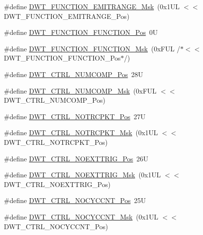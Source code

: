\begin{DoxyCompactItemize}
\item 
\#define \hyperlink{group___c_m_s_i_s___d_w_t_gad46dd5aba29f2e28d4d3f50b1d291f41}{D\-W\-T\-\_\-\-F\-U\-N\-C\-T\-I\-O\-N\-\_\-\-E\-M\-I\-T\-R\-A\-N\-G\-E\-\_\-\-Msk}~(0x1\-U\-L $<$$<$ D\-W\-T\-\_\-\-F\-U\-N\-C\-T\-I\-O\-N\-\_\-\-E\-M\-I\-T\-R\-A\-N\-G\-E\-\_\-\-Pos)
\item 
\#define \hyperlink{group___c_m_s_i_s___d_w_t_ga5797b556edde2bbaa4d33dcdb1a891bb}{D\-W\-T\-\_\-\-F\-U\-N\-C\-T\-I\-O\-N\-\_\-\-F\-U\-N\-C\-T\-I\-O\-N\-\_\-\-Pos}~0\-U
\item 
\#define \hyperlink{group___c_m_s_i_s___d_w_t_ga3b2cda708755ecf5f921d08b25d774d1}{D\-W\-T\-\_\-\-F\-U\-N\-C\-T\-I\-O\-N\-\_\-\-F\-U\-N\-C\-T\-I\-O\-N\-\_\-\-Msk}~(0x\-F\-U\-L /$\ast$$<$$<$ D\-W\-T\-\_\-\-F\-U\-N\-C\-T\-I\-O\-N\-\_\-\-F\-U\-N\-C\-T\-I\-O\-N\-\_\-\-Pos$\ast$/)
\item 
\#define \hyperlink{group___c_m_s_i_s___d_w_t_gaac44b9b7d5391a7ffef129b7f6c84cd7}{D\-W\-T\-\_\-\-C\-T\-R\-L\-\_\-\-N\-U\-M\-C\-O\-M\-P\-\_\-\-Pos}~28\-U
\item 
\#define \hyperlink{group___c_m_s_i_s___d_w_t_gaa3d37d68c2ba73f2026265584c2815e7}{D\-W\-T\-\_\-\-C\-T\-R\-L\-\_\-\-N\-U\-M\-C\-O\-M\-P\-\_\-\-Msk}~(0x\-F\-U\-L $<$$<$ D\-W\-T\-\_\-\-C\-T\-R\-L\-\_\-\-N\-U\-M\-C\-O\-M\-P\-\_\-\-Pos)
\item 
\#define \hyperlink{group___c_m_s_i_s___d_w_t_gaa82840323a2628e7f4a2b09b74fa73fd}{D\-W\-T\-\_\-\-C\-T\-R\-L\-\_\-\-N\-O\-T\-R\-C\-P\-K\-T\-\_\-\-Pos}~27\-U
\item 
\#define \hyperlink{group___c_m_s_i_s___d_w_t_ga04d8bb0a065ca38e2e5f13a97e1f7073}{D\-W\-T\-\_\-\-C\-T\-R\-L\-\_\-\-N\-O\-T\-R\-C\-P\-K\-T\-\_\-\-Msk}~(0x1\-U\-L $<$$<$ D\-W\-T\-\_\-\-C\-T\-R\-L\-\_\-\-N\-O\-T\-R\-C\-P\-K\-T\-\_\-\-Pos)
\item 
\#define \hyperlink{group___c_m_s_i_s___d_w_t_gad997b9026715d5609b5a3b144eca42d0}{D\-W\-T\-\_\-\-C\-T\-R\-L\-\_\-\-N\-O\-E\-X\-T\-T\-R\-I\-G\-\_\-\-Pos}~26\-U
\item 
\#define \hyperlink{group___c_m_s_i_s___d_w_t_gacc7d15edf7a27147c422099ab475953e}{D\-W\-T\-\_\-\-C\-T\-R\-L\-\_\-\-N\-O\-E\-X\-T\-T\-R\-I\-G\-\_\-\-Msk}~(0x1\-U\-L $<$$<$ D\-W\-T\-\_\-\-C\-T\-R\-L\-\_\-\-N\-O\-E\-X\-T\-T\-R\-I\-G\-\_\-\-Pos)
\item 
\#define \hyperlink{group___c_m_s_i_s___d_w_t_ga337f6167d960f57f12aa382ffecce522}{D\-W\-T\-\_\-\-C\-T\-R\-L\-\_\-\-N\-O\-C\-Y\-C\-C\-N\-T\-\_\-\-Pos}~25\-U
\item 
\#define \hyperlink{group___c_m_s_i_s___d_w_t_gaf40c8d7a4fd978034c137e90f714c143}{D\-W\-T\-\_\-\-C\-T\-R\-L\-\_\-\-N\-O\-C\-Y\-C\-C\-N\-T\-\_\-\-Msk}~(0x1\-U\-L $<$$<$ D\-W\-T\-\_\-\-C\-T\-R\-L\-\_\-\-N\-O\-C\-Y\-C\-C\-N\-T\-\_\-\-Pos)
$$
\end{DoxyCompactItemize}

